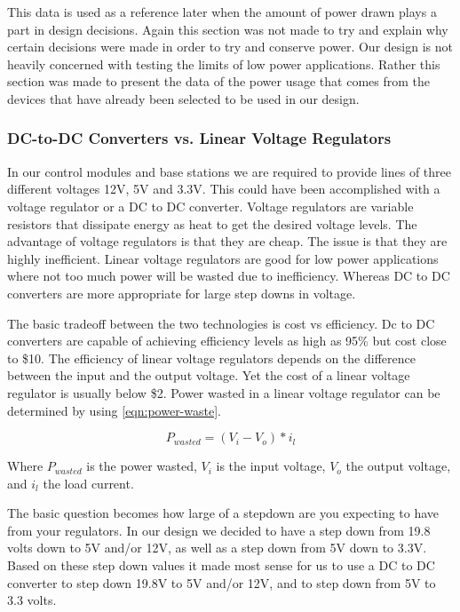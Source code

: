 This data is used as a reference later when the amount of power drawn plays a part in design decisions. Again this section
was not made to try and explain why certain decisions were made in order to try
and conserve power. Our design is not heavily concerned with testing the limits
of low power applications. Rather this section was made to present the data of
the power usage that comes from the devices that have already been selected to
be used in our design.


\subsubsection{DC-to-DC Converters vs. Linear Voltage Regulators}
In our control modules and base stations we are required to provide lines of
three different voltages 12V, 5V and 3.3V. This could have been accomplished with a
voltage regulator or a DC to DC converter. Voltage regulators are variable
resistors that dissipate energy as heat to get the desired voltage levels. The
advantage of voltage regulators is that they are cheap. The issue is that they
are highly inefficient. Linear voltage regulators are good for low power
applications where not too much power will be wasted due to inefficiency.
Whereas DC to DC converters are more appropriate for large step downs in
voltage.

The basic tradeoff between the two technologies is cost vs efficiency. Dc to DC
converters are capable of achieving efficiency levels as high as 95\% but cost
close to \$10. The efficiency of linear voltage regulators depends on the
difference between the input and the output voltage. Yet the cost of a linear
voltage regulator is usually below \$2. Power wasted in a linear voltage
regulator can be determined by using \autoref{eqn:power-waste}.

\begin{equation}
P_{wasted} = (V_i - V_o) * i_l
\label{eqn:power-waste}
\end{equation}

Where $P_{wasted}$ is the power wasted, $V_i$ is the input voltage, $V_o$ the
output voltage, and $i_l$ the load current.

The basic question becomes how large of a stepdown are you expecting to have
from your regulators. In our design we
decided to have a step down from 19.8 volts down to 5V and/or 12V, as well as a
step down from 5V down to 3.3V. Based on these step down values it made most
sense for us to use a DC to DC converter to step down 19.8V to 5V and/or 12V, and
to step down from 5V to 3.3 volts.

